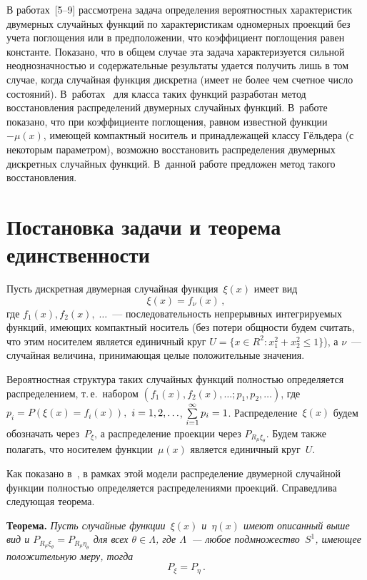 \begin{multicols}{2}
В работах~[5--9] рассмотрена задача определения вероятностных характеристик 
двумерных случайных функций
по характеристикам одномерных проекций без учета поглощения или в
предположении, что коэффициент поглощения равен константе.
Показано, что в общем случае эта задача характеризуется сильной
неоднозначностью и содержательные результаты удается
получить лишь в том случае, когда случайная функция дискретна (имеет не более
чем счетное число состояний). В~работах~\cite{7-us, 9-us} для класса таких
функций разработан метод восстановления распределений
двумерных случайных функций. В~работе~\cite{10-us} 
показано, что при коэффициенте поглощения, равном известной функции~$-\mu(x)$, 
имеющей компактный носитель и принадлежащей классу Гёльдера (с некоторым параметром), 
возможно восстановить распределения двумерных дискретных случайных функций. 
В~данной работе предложен метод такого вос\-ста\-нов\-ления.

\section{Постановка задачи и теорема единственности}

Пусть дискретная двумерная случайная функция~$\xi(x)$ имеет вид 
$$
\xi(x) = f_{\nu}(x)\,,
$$ 
где
$f_{1}(x),f_{2}(x),\;\ldots$~--- последовательность непрерывных
интегрируемых функций, имеющих компактный носитель 
(без потери общности будем считать, что этим носителем
является единичный круг $U=\{x\in R^2:x_1^2+x_2^2\leq 1\}$), а
$\nu$~--- случайная величина, принимающая целые положительные значения.

Вероятностная структура таких случайных функций полностью определяется распределением,
т.\,е.\ набором 
$
(f_{1}(x),f_{2}(x),\ldots;p_{1},p_{2},\ldots)
$, где 
$p_{i}=P(\xi(x) = f_{i}(x)),$ $i \hm= 1,2,\ldots$, 
$\sum\limits_{i=1}^{\infty}p_{i} \hm= 1$. Распределение~$\xi(x)$ будем
обозначать через~$P_\xi$, а распределение проекции через $P_{R_{\mu}\xi_{\theta}}$. 
Будем также полагать, что носителем функции~$\mu(x)$ является единичный круг~$U$.

Как показано в~\cite{10-us}, в рамках этой модели распределение двумерной 
случайной функции полностью определяется
распределениями проекций. Справедлива следующая теорема.

\medskip

\noindent
\textbf{Теорема.} \textit{Пусть случайные функции~$\xi(x)$ и~$\eta(x)$ имеют 
описанный выше вид и
$
P_{R_{\mu}\xi_{\theta}}=P_{R_{\mu}\eta_{\theta}}
$
для всех
$\theta\in\Lambda$, где $\Lambda$~--- любое подмножество~$S^1$, имеющее
положительную меру, тогда 
$$
P_\xi=P_\eta\,.
$$}


\end{multicols}
